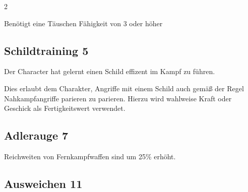\begin{multicols}{2}
\begin{tcolorbox}
Benötigt eine Täuschen Fähigkeit von 3 oder höher


\vspace{3mm}



\end{tcolorbox}

\begin{tcolorbox}
    \subsection*{Schildtraining \hfill \small{5 }}
    \tcblower
Der Character hat gelernt einen Schild effizent im Kampf zu führen.

Dies erlaubt dem Charakter, Angriffe mit einem Schild auch gemäß der Regel Nahkampfangriffe parieren zu parieren. Hierzu wird wahlweise Kraft oder Geschick als Fertigkeitswert verwendet.


\vspace{3mm}



\end{tcolorbox}

\begin{tcolorbox}
    \subsection*{Adlerauge \hfill \small{7 }}
    \tcblower
Reichweiten von Fernkampfwaffen sind um 25\% erhöht.


\vspace{3mm}



\end{tcolorbox}

\begin{tcolorbox}
    \subsection*{Ausweichen \hfill \small{11 }}
    \tcblower



\end{tcolorbox}
\end{multicols}
